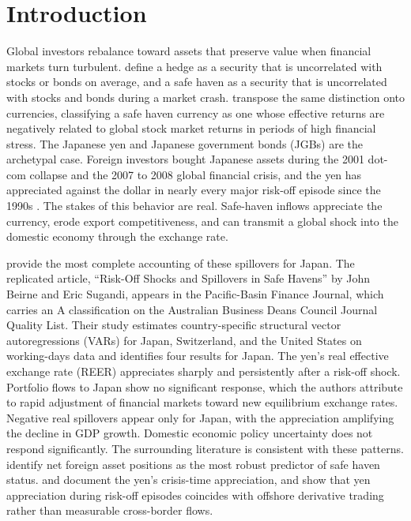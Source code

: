 \section{Introduction}

Global investors rebalance toward assets that preserve value when financial markets turn turbulent. \textcite{baur_lucey_2010} define a hedge as a security that is uncorrelated with stocks or bonds on average, and a safe haven as a security that is uncorrelated with stocks and bonds during a market crash. \textcite{hossfeld_macdonald_2014} transpose the same distinction onto currencies, classifying a safe haven currency as one whose effective returns are negatively related to global stock market returns in periods of high financial stress. The Japanese yen and Japanese government bonds (JGBs) are the archetypal case. Foreign investors bought Japanese assets during the 2001 dot-com collapse and the 2007 to 2008 global financial crisis, and the yen has appreciated against the dollar in nearly every major risk-off episode since the 1990s \parencite{beirne_sugandi_2023}. The stakes of this behavior are real. Safe-haven inflows appreciate the currency, erode export competitiveness, and can transmit a global shock into the domestic economy through the exchange rate.

\textcite{beirne_sugandi_2023} provide the most complete accounting of these spillovers for Japan. The replicated article, ``Risk-Off Shocks and Spillovers in Safe Havens'' by John Beirne and Eric Sugandi, appears in the Pacific-Basin Finance Journal, which carries an A classification on the Australian Business Deans Council Journal Quality List. Their study estimates country-specific structural vector autoregressions (VARs) for Japan, Switzerland, and the United States on working-days data and identifies four results for Japan. The yen's real effective exchange rate (REER) appreciates sharply and persistently after a risk-off shock. Portfolio flows to Japan show no significant response, which the authors attribute to rapid adjustment of financial markets toward new equilibrium exchange rates. Negative real spillovers appear only for Japan, with the appreciation amplifying the decline in GDP growth. Domestic economic policy uncertainty does not respond significantly. The surrounding literature is consistent with these patterns. \textcite{habib_stracca_2012} identify net foreign asset positions as the most robust predictor of safe haven status. \textcite{ranaldo_soderlind_2010} and \textcite{fatum_yamamoto_2015} document the yen's crisis-time appreciation, and \textcite{botman_carvalho_lam_2013} show that yen appreciation during risk-off episodes coincides with offshore derivative trading rather than measurable cross-border flows.

